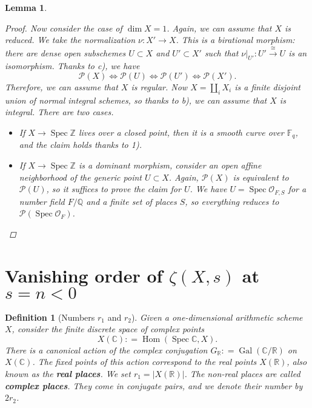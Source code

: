 \documentclass[draft]{article}
\DeclareMathOperator{\Gal}{Gal}
\DeclareMathOperator{\Hom}{Hom}
\DeclareMathOperator{\Spec}{Spec}
\newcommand{\CC}{\mathbb{C}}
\newcommand{\FF}{\mathbb{F}}
\newcommand{\QQ}{\mathbb{Q}}
\newcommand{\RR}{\mathbb{R}}
\newcommand{\ZZ}{\mathbb{Z}}
\newcommand{\dfn}{\mathrel{\mathop:}=}
\theoremstyle{myplain}
\newtheorem{lemma}[theorem]{Lemma}
\theoremstyle{mydefinition}
\newtheorem{definition}[theorem]{Definition}
\begin{document}
\begin{lemma}
\begin{proof}
    Now consider the case of $\dim X = 1$. Again, we can assume that $X$ is
    reduced. We take the normalization $\nu\colon X' \to X$. This is a
    birational morphism: there are dense open subschemes $U \subset X$ and
    $U' \subset X'$ such that
    $\left.\nu\right|_{U'}\colon U' \xrightarrow{\cong} U$ is an
    isomorphism. Thanks to c), we have
    \[ \mathcal{P} (X) \iff
      \mathcal{P} (U) \iff
      \mathcal{P} (U') \iff
      \mathcal{P} (X'). \]
    Therefore, we can assume that $X$ is regular. Now $X = \coprod_i X_i$ is a
    finite disjoint union of normal integral schemes, so thanks to b), we can
    assume that $X$ is integral. There are two cases.

    \begin{itemize}
    \item If $X \to \Spec \ZZ$ lives over a closed point, then it is a smooth
      curve over $\FF_q$, and the claim holds thanks to 1).

    \item If $X \to \Spec \ZZ$ is a dominant morphism, consider an open affine
      neighborhood of the generic point $U \subset X$. Again, $\mathcal{P} (X)$
      is equivalent to $\mathcal{P} (U)$, so it suffices to prove the claim for
      $U$. We have $U = \Spec \mathcal{O}_{F,S}$ for a number field $F/\QQ$ and
      a finite set of places $S$, so everything reduces to
      $\mathcal{P} (\Spec \mathcal{O}_F)$. \qedhere
    \end{itemize}
  \end{proof}
\end{lemma}


\section{Vanishing order of $\zeta (X,s)$ at $s = n < 0$}
\label{sec:vanishing-order}

\begin{definition}[Numbers $r_1$ and $r_2$]
  Given a one-dimensional arithmetic scheme $X$, consider the finite discrete
  space of complex points
  $$X(\CC) \dfn \Hom (\Spec \CC, X).$$
  There is a canonical action of the complex conjugation
  $G_\RR \dfn \Gal (\CC/\RR)$ on $X(\CC)$. The fixed points of this action
  correspond to the real points $X (\RR)$, also known as the
  \textbf{real places}. We set $r_1 = |X (\RR)|$. The non-real places are called
  \textbf{complex places}. They come in conjugate pairs, and we denote their
  number by $2 r_2$.
\end{definition}
\end{document}

